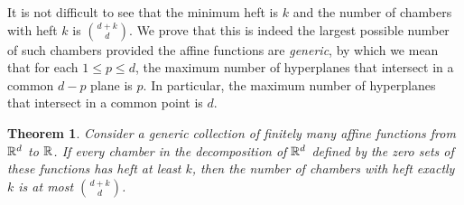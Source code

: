 \documentclass[10pt,a4paper]{article}
\newtheorem{theorem}{Theorem}[section]
\newcommand {\mm}[1] {\ifmmode{#1}\else{\mbox{\(#1\)}}\fi}
\theoremstyle{plain}
\newcommand{\Rspace}        {\mm{{\mathbb R}}}
\begin{document}
It is not difficult to see that the minimum heft is $k$ and the number of chambers with heft $k$ is $\binom{d+k}{d}$.
We prove that this is indeed the largest possible number of such chambers provided the affine functions are \emph{generic}, by which we mean that for each $1 \leq p \leq d$, the maximum number of hyperplanes that intersect in a common $d-p$ plane is $p$.
In particular, the maximum number of hyperplanes that intersect in a common point is $d$.
\begin{theorem}
  \label{thm:repeated_minimum_heft}
  Consider a generic collection of finitely many affine functions from $\Rspace^d$ to $\Rspace$.
  If every chamber in the decomposition of $\Rspace^d$ defined by the zero sets of these functions has heft at least $k$, then the number of chambers with heft exactly $k$ is at most $\binom{d+k}{d}$.
\end{theorem}
\end{document}
